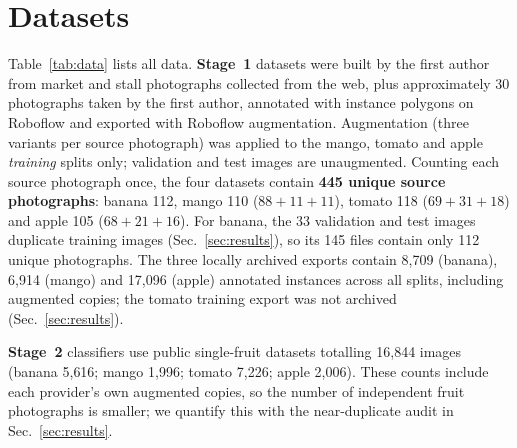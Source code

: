 \documentclass[10pt,twocolumn]{article}
\begin{document}
\section{Datasets}\label{sec:data}
Table~\ref{tab:data} lists all data. \textbf{Stage~1} datasets were built by the first author from market and stall photographs collected from the web, plus approximately 30 photographs taken by the first author, annotated with instance polygons on Roboflow and exported with Roboflow augmentation. Augmentation (three variants per source photograph) was applied to the mango, tomato and apple \emph{training} splits only; validation and test images are unaugmented. Counting each source photograph once, the four datasets contain \textbf{445 unique source photographs}: banana 112, mango 110 ($88+11+11$), tomato 118 ($69+31+18$) and apple 105 ($68+21+16$). For banana, the 33 validation and test images duplicate training images (Sec.~\ref{sec:results}), so its 145 files contain only 112 unique photographs. The three locally archived exports contain 8{,}709 (banana), 6{,}914 (mango) and 17{,}096 (apple) annotated instances across all splits, including augmented copies; the tomato training export was not archived (Sec.~\ref{sec:results}).

\textbf{Stage~2} classifiers use public single-fruit datasets totalling 16{,}844 images (banana 5{,}616; mango 1{,}996; tomato 7{,}226; apple 2{,}006). These counts include each provider's own augmented copies, so the number of independent fruit photographs is smaller; we quantify this with the near-duplicate audit in Sec.~\ref{sec:results}.
\end{document}
